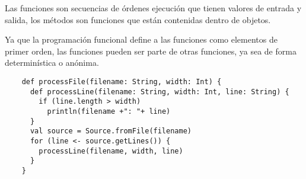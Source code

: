   Las funciones son secuencias de \'ordenes ejecuci\'on 
  que tienen valores de entrada y salida, los m\'etodos son
  funciones que est\'an contenidas dentro de objetos. 

  Ya que la programaci\'on funcional define a las funciones 
  como elementos de primer orden, las funciones pueden ser parte 
  de otras funciones, ya sea de forma determin\'istica o an\'onima.

  \begin{mylisting}
  \begin{verbatim}
    def processFile(filename: String, width: Int) {
      def processLine(filename: String, width: Int, line: String) {
        if (line.length > width)
          println(filename +": "+ line)
      }
      val source = Source.fromFile(filename)
      for (line <- source.getLines()) {
        processLine(filename, width, line)
      }
    }
  \end{verbatim}
  \end{mylisting}
